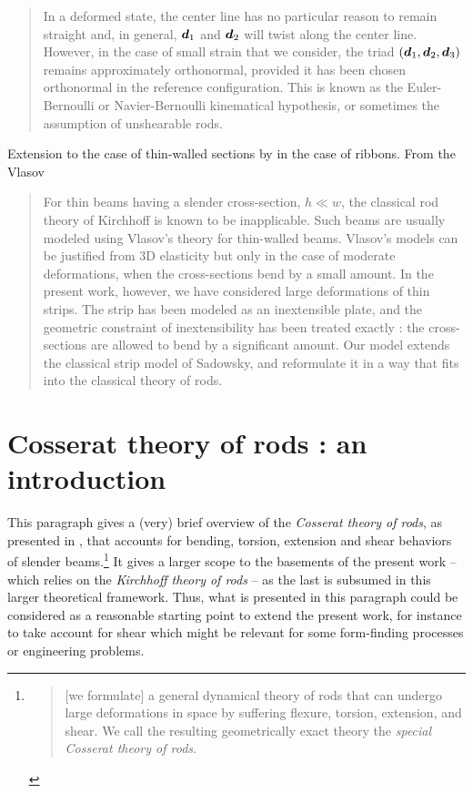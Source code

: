 \blockcquote[p.~68]{Audoly2010}{In a deformed state, the center line has no particular reason to remain straight and, in general, $\boldsymbol{d}_1$ and $\boldsymbol{d}_2$ will twist along the center line. However, in the case of small strain that we consider, the triad $(\boldsymbol{d}_1,\boldsymbol{d}_2,\boldsymbol{d}_3)$ remains approximately orthonormal, provided it has been chosen orthonormal in the reference configuration. This is known as the Euler-Bernoulli or Navier-Bernoulli kinematical hypothesis, or sometimes the assumption of unshearable rods.}

Extension to the case of thin-walled sections by \cite{Dias2015, Vetyukov2014} in the case of ribbons. From the Vlasov

\blockcquote[p.]{Dias2014}{For thin beams having a slender cross-section, $h \ll w$, the classical rod theory of Kirchhoff is known to be inapplicable. Such beams are usually modeled using Vlasov’s theory for thin-walled beams. Vlasov’s models can be justified from 3D elasticity but only in the case of moderate deformations, when the cross-sections bend by a small amount. In the present work, however, we have considered large deformations of thin strips. The strip has been modeled as an inextensible  plate, and the geometric  constraint of inextensibility has been treated exactly : the cross-sections are allowed to bend by a significant amount. Our model extends the classical strip model of Sadowsky, and reformulate it in a way that fits into the classical theory of rods.}

\clearpage
\section{Cosserat theory of rods : an introduction}

This paragraph gives a (very) brief overview of the \emph{Cosserat theory of rods}, as presented in \cite{Antman2005}, that accounts for bending, torsion, extension and shear  behaviors of slender beams.\footnote{\blockcquote[p.~270]{Antman2005}{[we formulate] a general dynamical theory of rods that can undergo large deformations in space by suffering flexure, torsion, extension, and shear. We call the resulting geometrically exact theory the \emph{special Cosserat theory of rods}.}} It gives a larger scope to the basements of the present work -- which relies on the \emph{Kirchhoff theory of rods} -- as the last is subsumed in this larger theoretical framework. Thus, what is presented in this paragraph could be considered as a reasonable starting point to extend the present work, for instance to take account for shear which might be relevant for some form-finding processes or engineering problems.

